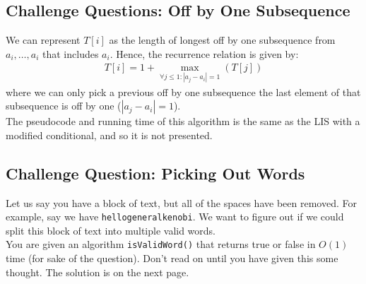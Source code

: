 \documentclass[14pt]{extarticle}
\begin{document}
    \begin{algorithm}[H]
    \end{algorithm}

    \subsection*{Challenge Questions: Off by One Subsequence}

    We can represent $T[i]$ as the length of longest off by one subsequence
    from $a_i, \ldots, a_i$ that includes $a_i$. Hence, the recurrence
    relation is given by:
    \begin{align*}
        T[i] = 1 + \max_{\forall j\leq 1: |a_j - a_i| = 1}\left(
            T[j]
        \right)
    \end{align*}
    where we can only pick a previous off by one subsequence the last
    element of that subsequence is off by one ($|a_j - a_i| = 1$).\\

    The pseudocode and running time of this algorithm is the same as 
    the LIS with a modified conditional, and so it is not presented.

    \subsection*{Challenge Question: Picking Out Words}
    Let us say you have a block of text, but all of the spaces have been
    removed. For example, say we have \texttt{hellogeneralkenobi}. We
    want to figure out if we could split this block of text into
    multiple valid words.\\

    You are given an algorithm \texttt{isValidWord()} that returns true
    or false in $O(1)$ time (for sake of the question). Don't read on
    until you have given this some thought. The solution is on the
    next page.
\end{document}

